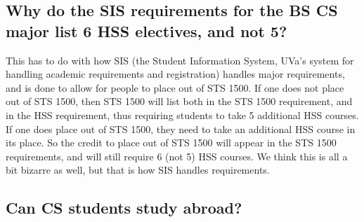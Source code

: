 \iffalse 
\subsection{Why are ECE 4435 and ECE 4440 not showing up in my list of
  fulfilled CS electives?}
\label{sec:sisece4435issue}

ECE 4435 (Computer Architecture \& Design) does not count as a CS
elective, as there is too much overlap with CS 3330 (Computer
Architecture); see section~\ref{bscscpedoublemajors}
(page~\pageref{bscscpedoublemajors}) for details.

As for ECE 4440 (Embedded Systems Design), this has to do with a
restriction in how SIS handles the CS elective requirements.  While it
can count as a CS elective, in order for this to happen a SIS
exception will need to be entered. 
office.  Note that this course can only count as one elective each,
even though it is a 4.5 credit course (meaning that only 3 credits
counts toward the CS elective requirement).

\fi

\subsection{Why do the SIS requirements for the BS CS major list 6 HSS
  electives, and not 5?}
\label{sec:sishssissue}

This has to do with how SIS (the Student Information System, UVa's
system for handling academic requirements and registration) handles
major requirements, and is done to allow for people to place out of
STS 1500. If one does not place out of STS 1500, then STS 1500 will
list both in the STS 1500 requirement, and in the HSS requirement,
thus requiring students to take 5 additional HSS courses. If one does
place out of STS 1500, they need to take an additional HSS course in
its place. So the credit to place out of STS 1500 will appear in the
STS 1500 requirements, and will still require 6 (not 5) HSS courses.
We think this is all a bit bizarre as well, but that is how SIS
handles requirements.


\subsection{Can CS students study abroad?}

